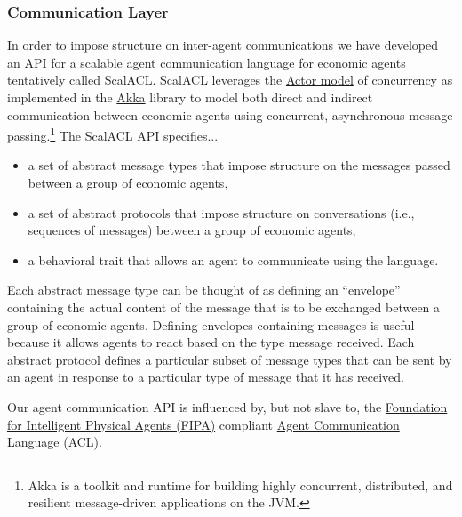 \documentclass[11pt]{amsart}
\begin{document}
\subsubsection{Communication Layer}
In order to impose structure on inter-agent communications we have developed an API for a scalable agent communication language for economic agents tentatively called ScalACL. ScalACL leverages the \href{https://en.wikipedia.org/wiki/Actor_model}{Actor model} of concurrency as implemented in the \href{http://akka.io/}{Akka} library to model both direct and indirect communication between economic agents using concurrent, asynchronous message passing.\footnote{
%
Akka is a toolkit and runtime for building highly concurrent, distributed, and resilient message-driven applications on the JVM.
%
}
The ScalACL API specifies...
\begin{itemize}
    \item a set of abstract message types that impose structure on the messages passed between a group of economic agents,
    \item a set of abstract protocols that impose structure on conversations (i.e., sequences of messages) between a group of economic agents,
    \item a behavioral trait that allows an agent to communicate using the language.
\end{itemize}
Each abstract message type can be thought of as defining an ``envelope'' containing the actual content of the message that is to be exchanged between a group of economic agents. Defining envelopes containing messages is useful because it allows agents to react based on the type message received. Each abstract protocol defines a particular subset of message types that can be sent by an agent in response to a particular type of message that it has received. 

Our agent communication API is influenced by, but not slave to, the \href{http://www.fipa.org/}{Foundation for Intelligent Physical Agents (FIPA)} compliant \href{http://www.fipa.org/specs/fipa00037/SC00037J.pdf}{Agent Communication Language (ACL)}.

\end{document}
